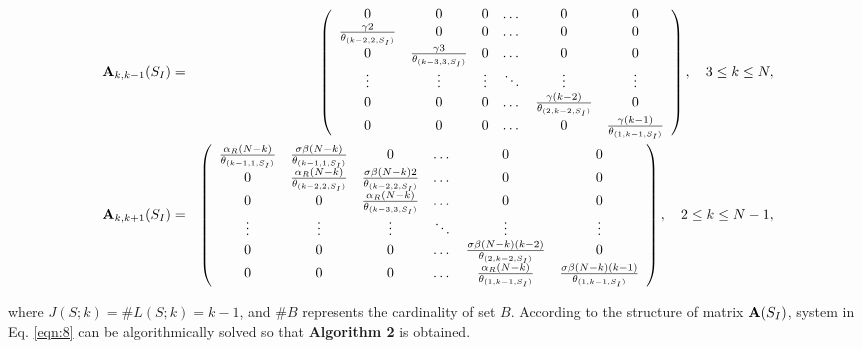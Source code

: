 \documentclass[10pt,A4paper]{article}
\begin{document}
\begin{eqnarray*}
 {\bf A}_{k,k-1}(S_I) &=& \left(\begin{array}{cccccc}
0 & 0 & 0 & \dots & 0 & 0\\
\frac{\gamma2}{\theta_{(k-2,2,S_I)}} & 0 & 0 & \dots & 0 & 0\\
0 & \frac{\gamma3}{\theta_{(k-3,3,S_I)}} & 0 & \dots & 0 & 0\\
\vdots & \vdots & \vdots & \ddots & \vdots & \vdots\\
0 & 0 & 0 & \dots & \frac{\gamma(k-2)}{\theta_{(2,k-2,S_I)}} & 0\\
0 & 0 & 0 & \dots & 0 & \frac{\gamma(k-1)}{\theta_{(1,k-1,S_I)}}
                        \end{array}\right),\quad 3\leq k\leq N,\\
 {\bf A}_{k,k+1}(S_I) &=& \left(\begin{array}{cccccc}
\frac{\alpha_R(N-k)}{\theta_{(k-1,1,S_I)}} & \frac{\sigma\beta(N-k)}{\theta_{(k-1,1,S_I)}} & 0 & \dots & 0 & 0\\
0 & \frac{\alpha_R(N-k)}{\theta_{(k-2,2,S_I)}} & \frac{\sigma\beta(N-k)2}{\theta_{(k-2,2,S_I)}} & \dots & 0 & 0\\
0 & 0 & \frac{\alpha_R(N-k)}{\theta_{(k-3,3,S_I)}} & \dots & 0 & 0\\
\vdots & \vdots & \vdots & \ddots & \vdots & \vdots\\
0 & 0 & 0 & \dots & \frac{\sigma\beta(N-k)(k-2)}{\theta_{(2,k-2,S_I)}} & 0\\
0 & 0 & 0 & \dots & \frac{\alpha_R(N-k)}{\theta_{(1,k-1,S_I)}} & \frac{\sigma\beta(N-k)(k-1)}{\theta_{(1,k-1,S_I)}}
                        \end{array}\right),\quad 2\leq k\leq N-1,
\end{eqnarray*}

\par\noindent where $J(S;k)=\# L(S;k)=k-1$, and $\#B$ represents the cardinality of set $B$. According to the structure of matrix ${\bf A}(S_I)$,
system in Eq. \eqref{eqn:8} can be algorithmically solved so that {\bf Algorithm 2} is obtained.
\end{document}
